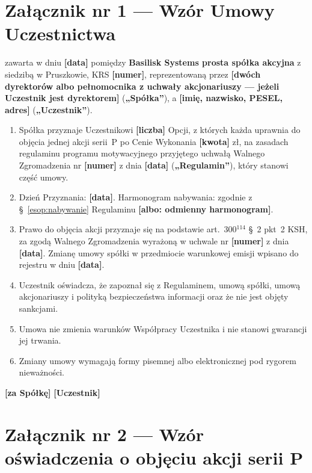 \documentclass[11pt,a4paper]{report}
\newcommand{\field}[1]{\textbf{[#1]}}
\newcommand{\CompanyFull}{Basilisk Systems prosta spółka akcyjna}
\begin{document}
\chapter*{Załącznik nr 1 --- Wzór Umowy Uczestnictwa}

zawarta w dniu \field{data} pomiędzy \textbf{\CompanyFull{}} z siedzibą w Pruszkowie, KRS \field{numer}, reprezentowaną przez \field{dwóch dyrektorów albo pełnomocnika z uchwały akcjonariuszy --- jeżeli Uczestnik jest dyrektorem} (\textbf{„Spółka”}), a \field{imię, nazwisko, PESEL, adres} (\textbf{„Uczestnik”}).

\begin{enumerate}
  \item Spółka przyznaje Uczestnikowi \field{liczba} Opcji, z których każda uprawnia do objęcia jednej akcji serii~P po Cenie Wykonania \field{kwota} zł, na zasadach regulaminu programu motywacyjnego przyjętego uchwałą Walnego Zgromadzenia nr \field{numer} z dnia \field{data} (\textbf{„Regulamin”}), który stanowi część umowy.
  \item Dzień Przyznania: \field{data}. Harmonogram nabywania: zgodnie z §~\ref{esop:nabywanie} Regulaminu \field{albo: odmienny harmonogram}.
  \item Prawo do objęcia akcji przyznaje się na podstawie art.~300$^{114}$ §~2 pkt~2 KSH, za zgodą Walnego Zgromadzenia wyrażoną w uchwale nr \field{numer} z dnia \field{data}. Zmianę umowy spółki w przedmiocie warunkowej emisji wpisano do rejestru w dniu \field{data}.
  \item Uczestnik oświadcza, że zapoznał się z Regulaminem, umową spółki, umową akcjonariuszy i polityką bezpieczeństwa informacji oraz że nie jest objęty sankcjami.
  \item Umowa nie zmienia warunków Współpracy Uczestnika i nie stanowi gwarancji jej trwania.
  \item Zmiany umowy wymagają formy pisemnej albo elektronicznej pod rygorem nieważności.
\end{enumerate}

\vspace{1em}
\field{za Spółkę} \hfill \field{Uczestnik}

\chapter*{Załącznik nr 2 --- Wzór oświadczenia o objęciu akcji serii P}
\end{document}
